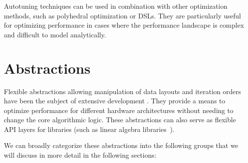 


Autotuning techniques can be used in combination with other optimization methods, such as polyhedral optimization or DSLs\@. They are particularly useful for optimizing performance in cases where the performance landscape is complex and difficult to model analytically.


\section{Abstractions}\label{sec:abstractions}

Flexible abstractions allowing manipulation of data layouts and iteration orders have been the subject of extensive development . They provide a means to optimize performance for different hardware architectures without needing to change the core algorithmic logic. These abstractions can also serve as flexible API layers for libraries (such as linear algebra libraries~\cite{whaley1998automatically}).

We can broadly categorize these abstractions into the following groups that we will discuss in more detail in the following sections:

